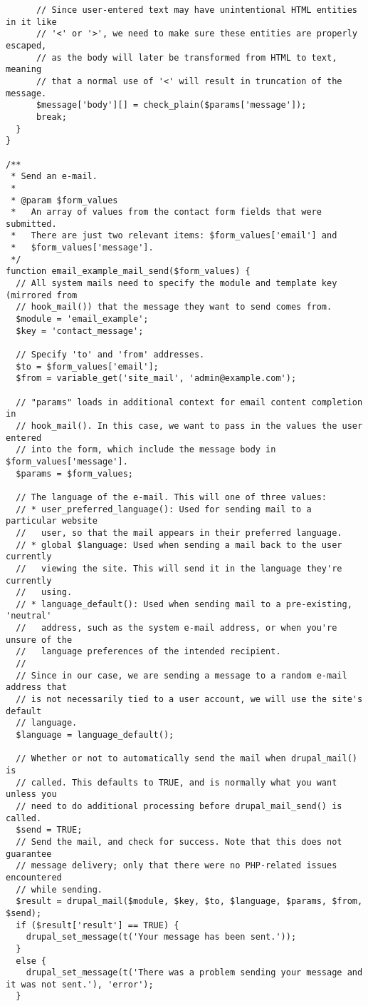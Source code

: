 \documentclass[11pt]{article}
\begin{document}
\begin{verbatim}
      // Since user-entered text may have unintentional HTML entities in it like
      // '<' or '>', we need to make sure these entities are properly escaped,
      // as the body will later be transformed from HTML to text, meaning
      // that a normal use of '<' will result in truncation of the message.
      $message['body'][] = check_plain($params['message']);
      break;
  }
}

/**
 * Send an e-mail.
 *
 * @param $form_values
 *   An array of values from the contact form fields that were submitted.
 *   There are just two relevant items: $form_values['email'] and
 *   $form_values['message'].
 */
function email_example_mail_send($form_values) {
  // All system mails need to specify the module and template key (mirrored from
  // hook_mail()) that the message they want to send comes from.
  $module = 'email_example';
  $key = 'contact_message';

  // Specify 'to' and 'from' addresses.
  $to = $form_values['email'];
  $from = variable_get('site_mail', 'admin@example.com');

  // "params" loads in additional context for email content completion in
  // hook_mail(). In this case, we want to pass in the values the user entered
  // into the form, which include the message body in $form_values['message'].
  $params = $form_values;

  // The language of the e-mail. This will one of three values:
  // * user_preferred_language(): Used for sending mail to a particular website
  //   user, so that the mail appears in their preferred language.
  // * global $language: Used when sending a mail back to the user currently
  //   viewing the site. This will send it in the language they're currently
  //   using.
  // * language_default(): Used when sending mail to a pre-existing, 'neutral'
  //   address, such as the system e-mail address, or when you're unsure of the
  //   language preferences of the intended recipient.
  //
  // Since in our case, we are sending a message to a random e-mail address that
  // is not necessarily tied to a user account, we will use the site's default
  // language.
  $language = language_default();

  // Whether or not to automatically send the mail when drupal_mail() is
  // called. This defaults to TRUE, and is normally what you want unless you
  // need to do additional processing before drupal_mail_send() is called.
  $send = TRUE;
  // Send the mail, and check for success. Note that this does not guarantee
  // message delivery; only that there were no PHP-related issues encountered
  // while sending.
  $result = drupal_mail($module, $key, $to, $language, $params, $from, $send);
  if ($result['result'] == TRUE) {
    drupal_set_message(t('Your message has been sent.'));
  }
  else {
    drupal_set_message(t('There was a problem sending your message and it was not sent.'), 'error');
  }


\end{verbatim}
\end{document}
